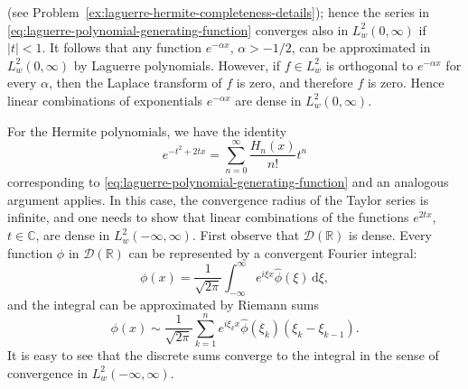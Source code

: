 (see Problem~\ref{ex:laguerre-hermite-completeness-details}); hence the series in \eqref{eq:laguerre-polynomial-generating-function} converges also in $L_w^2(0,\infty)$ if $|t|<1$. It follows that any function $e^{-\alpha x}$, $\alpha>-1/2$, can be approximated in $L_w^2(0,\infty)$ by Laguerre polynomials. However, if $f\in L_w^2$ is orthogonal to $e^{-\alpha x}$ for every $\alpha$, then the Laplace transform of $f$ is zero, and therefore $f$ is zero. Hence linear combinations of exponentials $e^{-\alpha x}$ are dense in $L_w^2(0,\infty)$.

For the Hermite polynomials, we have the identity
\begin{equation}\label{eq:hermite-polynomial-generating-function}
e^{-t^2+2tx}=\sum_{n=0}^\infty\dfrac{H_n(x)}{n!}t^n
\end{equation}
corresponding to \eqref{eq:laguerre-polynomial-generating-function} and an analogous argument applies. In this case, the convergence radius of the Taylor series is infinite, and one needs to show that linear combinations of the functions $e^{2tx}$, $t\in\mathbb{C}$, are dense in $L_w^2(-\infty,\infty)$. First observe that $\mathcal{D}(\mathbb{R})$ is dense. Every function $\phi$ in $\mathcal{D}(\mathbb{R})$ can be represented by a convergent Fourier integral:
\begin{equation}\label{eq:hermite-completeness-fourier-inversion}
\phi(x)=\dfrac1{\sqrt{2\pi}}\int_{-\infty}^\infty e^{i\xi x}\widehat\phi(\xi)\,\mathrm{d}\xi,
\end{equation}
and the integral can be approximated by Riemann sums
\begin{equation}\label{eq:hermite-completeness-fourier-riemann-sums}
\phi(x)\sim\dfrac1{\sqrt{2\pi}}\sum_{k=1}^n e^{i\xi_kx}\widehat\phi(\xi_k)(\xi_k-\xi_{k-1}).
\end{equation}
It is easy to see that the discrete sums converge to the integral in the sense of convergence in $L_w^2(-\infty,\infty)$.

